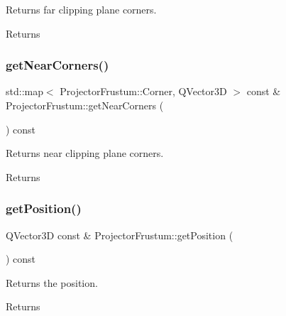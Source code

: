 Returns far clipping plane corners. 

\begin{DoxyReturn}{Returns}

\end{DoxyReturn}
\mbox{\label{class_projector_frustum_a940f0000d14b46b8678b4c6910a18831}} 
\subsubsection{\texorpdfstring{get\+Near\+Corners()}{getNearCorners()}}
{\footnotesize\ttfamily std\+::map$<$ Projector\+Frustum\+::\+Corner, Q\+Vector3D $>$ const  \& Projector\+Frustum\+::get\+Near\+Corners (\begin{DoxyParamCaption}{ }\end{DoxyParamCaption}) const}



Returns near clipping plane corners. 

\begin{DoxyReturn}{Returns}

\end{DoxyReturn}
\mbox{\label{class_projector_frustum_a45f134fc399cff7c2f3a518e8cf5674d}} 
\subsubsection{\texorpdfstring{get\+Position()}{getPosition()}}
{\footnotesize\ttfamily Q\+Vector3D const  \& Projector\+Frustum\+::get\+Position (\begin{DoxyParamCaption}{ }\end{DoxyParamCaption}) const}



Returns the position. 

\begin{DoxyReturn}{Returns}

\end{DoxyReturn}
\mbox{\label{class_projector_frustum_a31107a66549d2aed4c17a936989d2427}} 
